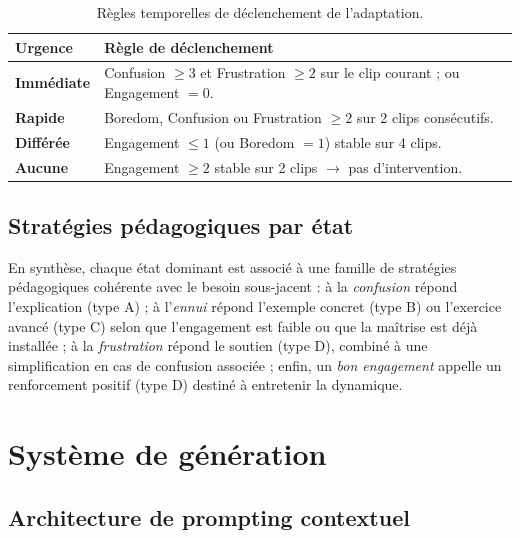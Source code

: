 \begin{table}[H]
\centering
\renewcommand{\arraystretch}{1.2}
\begin{tabular}{>{\bfseries}l p{8.6cm}}
\toprule
Urgence & Règle de déclenchement \\
\midrule
Immédiate & Confusion $\geq 3$ et Frustration $\geq 2$ sur le clip courant ; ou Engagement $= 0$. \\
Rapide    & Boredom, Confusion ou Frustration $\geq 2$ sur 2 clips consécutifs. \\
Différée  & Engagement $\leq 1$ (ou Boredom $= 1$) stable sur 4 clips. \\
Aucune    & Engagement $\geq 2$ stable sur 2 clips $\rightarrow$ pas d'intervention. \\
\bottomrule
\end{tabular}
\caption{Règles temporelles de déclenchement de l'adaptation.}
\label{tab:temporel}
\end{table}

\subsection{Stratégies pédagogiques par état}

En synthèse, chaque état dominant est associé à une famille de stratégies
pédagogiques cohérente avec le besoin sous-jacent : à la \emph{confusion} répond
l'explication (type A) ; à l'\emph{ennui} répond l'exemple concret (type B) ou
l'exercice avancé (type C) selon que l'engagement est faible ou que la maîtrise
est déjà installée ; à la \emph{frustration} répond le soutien (type D), combiné
à une simplification en cas de confusion associée ; enfin, un \emph{bon
engagement} appelle un renforcement positif (type D) destiné à entretenir la
dynamique.

\section{Système de génération}
\label{sec:generation}

\subsection{Architecture de prompting contextuel}

